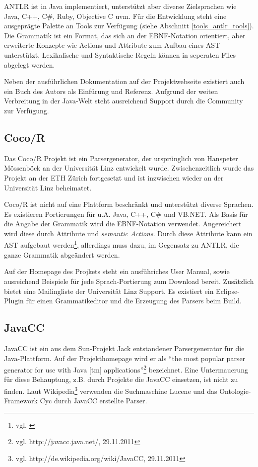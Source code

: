 ANTLR ist in Java implementiert, unterstützt aber diverse Zielsprachen wie Java, C++, C\#, Ruby, Objective C uvm. Für die Entwicklung steht eine ausgeprägte Palette an Tools zur Verfügung (siehe Abschnitt \ref{tools_antlr_tools}). Die Grammatik ist ein Format, das sich an der EBNF-Notation orientiert, aber erweiterte Konzepte wie Actions und Attribute zum Aufbau eines AST unterstützt. Lexikalische und Syntaktische Regeln können in seperaten Files abgelegt werden.

Neben der ausführlichen Dokumentation auf der Projektwebseite existiert auch ein Buch des Autors als Einfürung und Referenz\cite{Parr07}. Aufgrund der weiten Verbreitung in der Java-Welt steht ausreichend Support durch die Community zur Verfügung.



\subsection{Coco/R} 

Das Coco/R Projekt\cite{HaMo90} ist ein Parsergenerator, der ursprünglich von Hans\-peter Mössenböck an der Universität Linz entwickelt wurde. Zwischenzeitlich wurde das Projekt an der ETH Zürich fortgesetzt und ist inzwischen wieder an der Universität Linz beheimatet.

Coco/R ist nicht auf eine Plattform beschränkt und unterstützt diverse Sprachen. Es existieren Portierungen für u.A. Java, C++, C\# und VB.NET. Als Basis für die Angabe der Grammatik wird die EBNF-Notation verwendet. Angereichert wird diese durch Attribute und \emph{semantic Actions}. Durch diese Attribute kann ein AST aufgebaut werden\footnote{vgl. \cite{Moes11}}, allerdings muss dazu, im Gegensatz zu ANTLR, die ganze Grammatik abgeändert werden.

Auf der Homepage des Projkets steht ein ausführiches User Manual, sowie ausreichend Beispiele für jede Sprach-Portierung zum Download bereit. Zusätzlich bietet eine Mailingliste der Universität Linz Support. Es existiert ein Eclipse-Plugin für einen Grammatikeditor und die Erzeugung des Parsers beim Build.

\subsection{JavaCC}


JavaCC ist ein aus dem Sun-Projekt Jack entstandener Parsergenerator für die Java-Plattform. Auf der Projekthomepage wird er als ``the most popular parser generator for use with Java [tm] applications''\footnote{vgl. http://javacc.java.net/, 29.11.2011} bezeichnet. Eine Untermauerung für diese Behauptung, z.B. durch Projekte die JavaCC einsetzen, ist nicht zu finden. Laut Wikipedia\footnote{vgl. http://de.wikipedia.org/wiki/JavaCC, 29.11.2011} verwenden die Suchmaschine Lucene und das Ontologie-Framework Cyc durch JavaCC erstellte Parser.

